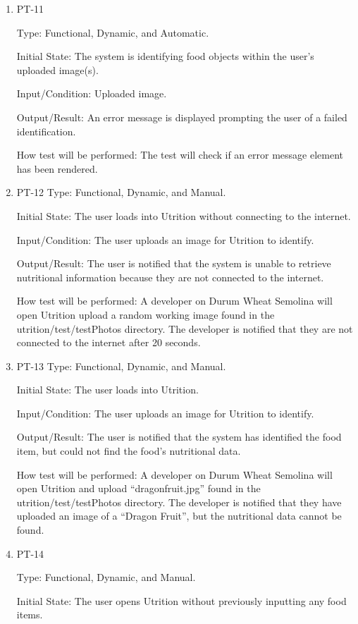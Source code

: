 \documentclass[12pt, titlepage]{article}
\begin{document}
\begin{enumerate}
		\item{PT-11}
		
		Type: Functional, Dynamic, and Automatic.
		
		Initial State: The system is identifying food objects within the user's 
		uploaded image(s).
		
		Input/Condition: Uploaded image.
		
		Output/Result: An error message is displayed prompting the user of a failed 
		identification.
		
		How test will be performed: The test will check if an error message element has been rendered.
		
		\item{PT-12}
		Type: Functional, Dynamic, and Manual.
		
		Initial State: The user loads into Utrition without connecting to the internet.
		
		Input/Condition: The user uploads an image for Utrition to identify.
		
		Output/Result: The user is notified that the system is unable to retrieve nutritional information because they are not connected to the internet.
		
		How test will be performed: A developer on Durum Wheat Semolina will open Utrition upload a random working image found in the utrition/test/testPhotos directory. The developer is notified that they are not connected to the internet after 20 seconds.
		
		\item{PT-13} 
		Type: Functional, Dynamic, and Manual.
		
		Initial State: The user loads into Utrition.
		
		Input/Condition: The user uploads an image for Utrition to identify.
		
		Output/Result: The user is notified that the system has identified the food item, but could not find the food’s nutritional data.
		
		How test will be performed: A developer on Durum Wheat Semolina will open Utrition and upload “dragonfruit.jpg” found in the utrition/test/testPhotos directory. The developer is notified that they have uploaded an image of a “Dragon Fruit”, but the nutritional data cannot be found.
		
		\item{PT-14} 
		
		Type: Functional, Dynamic, and Manual.
		
		Initial State: The user opens Utrition without previously inputting any food items.
		

\end{enumerate}
\end{document}
